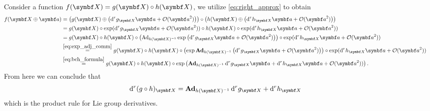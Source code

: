 Consider a function $f(\X) = g(\X) \circ h(\X)$, we utilize \eqref{eq:right_approx} to obtain
\begin{equation}
  \begin{aligned}
    f(\X \oplus \a) & = \left( g (\X) \oplus \left(\mathrm{d}^r g_\X \a + \mathcal O(\a^2) \right) \right) \circ  \left( h (\X) \oplus \left( \mathrm{d}^r h_\X  \a + \mathcal O(\a^2) \right) \right)
    \\
                    & = g(\X) \circ \exp( \mathrm{d}^r g_\X \a + \mathcal O(\a^2)) \circ h(\X) \circ \exp( \mathrm{d}^r h_\X \a + \mathcal O(\a^2))
    \\
                    & = g(\X) \circ h(\X) \circ \left( \Ad_{h(\X)^{-1}} \exp \left( \mathrm{d}^r g_\X \a + \mathcal O(\a^2) \right)  \right) \circ \exp( \mathrm{d}^r h_\X \a+ \mathcal O(\a^2) )
    \\
                    & \overset{\eqref{eq:exp_adj_comm}}=  g(\X) \circ h(\X) \circ \left( \exp \bAd_{h(\X)^{-1}} \left( \mathrm{d}^r g_\X \a + \mathcal O(\a^2) \right)\right) \circ \exp( \mathrm{d}^r h_\X \a + \mathcal O(\a^2))
    \\
                    & \overset{\eqref{eq:bch_formula}}=  g(\X) \circ h(\X) \circ \exp \left( \bAd_{h(\X)^{-1}} \mathrm{d}^r g_\X \a + \mathrm{d}^r h_\X \a + \mathcal O(\a^2)) \right).
  \end{aligned}
\end{equation}
From here we can conclude that
\begin{equation}
  \label{eq:product_rule}
  \mathrm{d}^r (g \circ h)_\X = \bAd_{h(\X)^{-1}} \mathrm{d}^r g_\X + \mathrm{d}^r h_\X
\end{equation}
which is the product rule for Lie group derivatives.

